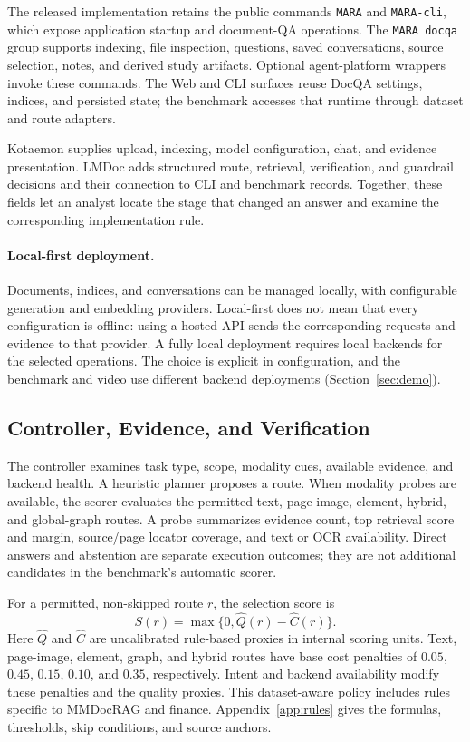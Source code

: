 The released implementation retains the public commands \texttt{MARA} and \texttt{MARA-cli}, which expose application startup and document-QA operations. The \texttt{MARA docqa} group supports indexing, file inspection, questions, saved conversations, source selection, notes, and derived study artifacts. Optional agent-platform wrappers invoke these commands. The Web and CLI surfaces reuse DocQA settings, indices, and persisted state; the benchmark accesses that runtime through dataset and route adapters.

Kotaemon supplies upload, indexing, model configuration, chat, and evidence presentation. LMDoc adds structured route, retrieval, verification, and guardrail decisions and their connection to CLI and benchmark records. Together, these fields let an analyst locate the stage that changed an answer and examine the corresponding implementation rule.

\paragraph{Local-first deployment.}
Documents, indices, and conversations can be managed locally, with configurable generation and embedding providers. Local-first does not mean that every configuration is offline: using a hosted API sends the corresponding requests and evidence to that provider. A fully local deployment requires local backends for the selected operations. The choice is explicit in configuration, and the benchmark and video use different backend deployments (Section~\ref{sec:demo}).

\subsection{Controller, Evidence, and Verification}
\label{sec:controller}
The controller examines task type, scope, modality cues, available evidence, and backend health. A heuristic planner proposes a route. When modality probes are available, the scorer evaluates the permitted text, page-image, element, hybrid, and global-graph routes. A probe summarizes evidence count, top retrieval score and margin, source/page locator coverage, and text or OCR availability. Direct answers and abstention are separate execution outcomes; they are not additional candidates in the benchmark's automatic scorer.

For a permitted, non-skipped route $r$, the selection score is
\begin{equation}
 S(r)=\max\{0,\widehat Q(r)-\widehat C(r)\}.
\end{equation}
Here $\widehat Q$ and $\widehat C$ are uncalibrated rule-based proxies in internal scoring units. Text, page-image, element, graph, and hybrid routes have base cost penalties of $0.05$, $0.45$, $0.15$, $0.10$, and $0.35$, respectively. Intent and backend availability modify these penalties and the quality proxies. This dataset-aware policy includes rules specific to MMDocRAG and finance. Appendix~\ref{app:rules} gives the formulas, thresholds, skip conditions, and source anchors.



